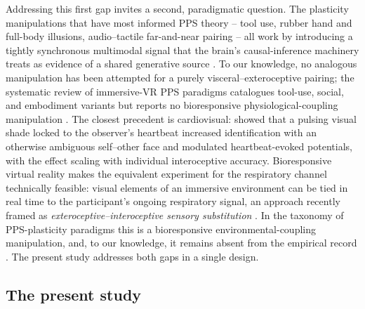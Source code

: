 Addressing this first gap invites a second, paradigmatic question. The plasticity manipulations that have most informed PPS theory -- tool use, rubber hand and full-body illusions, audio--tactile far-and-near pairing -- all work by introducing a tightly synchronous multimodal signal that the brain's causal-inference machinery treats as evidence of a shared generative source \citep{samad_2015, chancel_2021, costantini_2016, parise_2016}. To our knowledge, no analogous manipulation has been attempted for a purely visceral--exteroceptive pairing; the systematic review of immersive-VR PPS paradigms catalogues tool-use, social, and embodiment variants but reports no bioresponsive physiological-coupling manipulation \citep{karakoc_2025}. The closest precedent is cardiovisual: \citet{sel_2016} showed that a pulsing visual shade locked to the observer's heartbeat increased identification with an otherwise ambiguous self--other face and modulated heartbeat-evoked potentials, with the effect scaling with individual interoceptive accuracy. Bioresponsive virtual reality makes the equivalent experiment for the respiratory channel technically feasible: visual elements of an immersive environment can be tied in real time to the participant's ongoing respiratory signal, an approach recently framed as \emph{exteroceptive--interoceptive sensory substitution} \citep{Goral2024}. In the taxonomy of PPS-plasticity paradigms this is a bioresponsive environmental-coupling manipulation, and, to our knowledge, it remains absent from the empirical record \citep{karakoc_2025, serino2017peripersonal, belli2021breathink, Belli2024}. The present study addresses both gaps in a single design.

\subsection{The present study}


